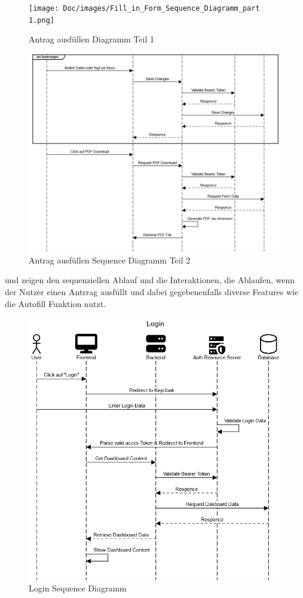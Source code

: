 \begin{figure}[H]
    \texttt{[image: Doc/images/Fill\_in\_Form\_Sequence\_Diagramm\_part 1.png]}
    \caption{Antrag ausfüllen Diagramm Teil 1}\label{fig:Antrag Flow 1}
\end{figure}   
\begin{figure}[H]
    \includegraphics[width=15cm]{Doc/images/Fill_in_Form_Sequence_Diagramm_part_2.png}
    \caption{Antrag ausfüllen Sequence Diagramm Teil 2}\label{fig:Antrag Flow 2}
\end{figure}
 und  zeigen den sequenziellen Ablauf 
und die Interaktionen, die Ablaufen, wenn der Nutzer einen Antrrag ausfüllt und dabei 
gegebenenfalls diverse Features wie die Autofill Funktion nutzt.
\begin{figure}[H]
    \includegraphics[width=15cm]{Doc/images/Login.png}
    \caption{Login Sequence Diagramm}\label{fig:Login Flow}
\end{figure}
